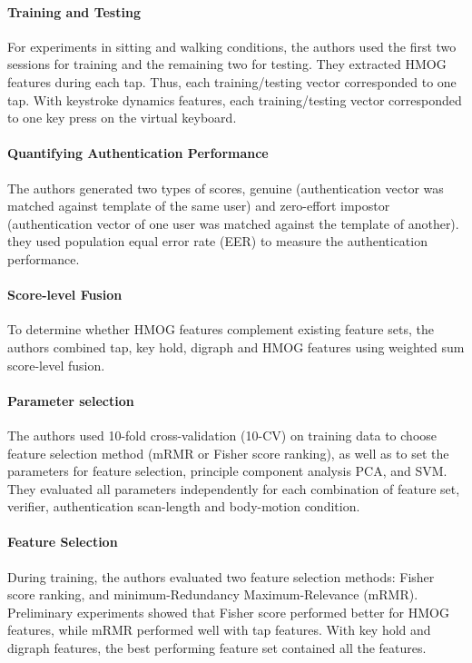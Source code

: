\documentclass{article}
\begin{document}
\paragraph{Training and Testing}  For experiments in sitting and walking conditions, the authors used the first two sessions for training and the remaining two for testing. They extracted HMOG features during each tap. Thus, each training/testing vector corresponded to one tap. With keystroke dynamics features, each training/testing vector corresponded to one key press on the virtual keyboard.%

\paragraph{Quantifying Authentication Performance}
The authors generated two types of scores, genuine (authentication vector was matched against template of the same user) and zero-effort impostor (authentication vector of one user was matched against the template of another). they used population equal error rate (EER) to measure the authentication performance.

\paragraph{Score-level Fusion}
To determine whether HMOG features complement existing feature sets, the authors combined tap, key hold, digraph and HMOG features using weighted sum score-level fusion.

\paragraph{Parameter selection}
The authors used 10-fold cross-validation (10-CV) on training data to choose feature selection method (mRMR or Fisher score ranking), as well as to set the parameters for feature selection, principle component analysis PCA, and SVM. They evaluated all parameters independently for each combination of feature set, verifier, authentication scan-length and body-motion condition.

\paragraph{Feature Selection} 
%
During training, the authors evaluated two feature selection methods: Fisher score ranking, 
and minimum-Redundancy Maximum-Relevance (mRMR). 
Preliminary experiments showed that Fisher score performed better for HMOG features, while mRMR performed well with tap features. With key hold and digraph features, the best performing feature set contained all the features.
\end{document}
